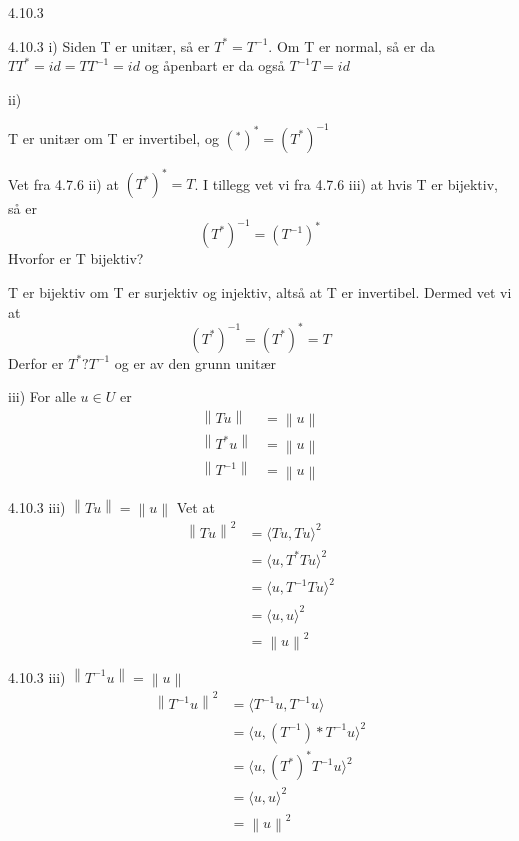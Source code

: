 \documentclass[a4paper,norsk]{article}
\begin{document}
\begin{oppgavebox}{4.10.3}{}
\begin{proofbox}{4.10.3 i)}{}
    Siden T er unitær, så er $ T^* = T^{-1} $. Om T er normal, så er da $ TT^* = id  = TT^{-1} = id$ og åpenbart er da også $ T^{-1} T = id $ 
\end{proofbox}

ii)
\begin{proofbox}
    T er unitær om T er invertibel, og $ \left( ^* \right) ^* = \left( T^* \right) ^{-1} $ 

    Vet fra 4.7.6 ii) at $ \left( T^* \right) ^* = T $. I tillegg vet vi fra 4.7.6 iii) at hvis T er bijektiv, så er \[
        \left( T^* \right) ^{-1} = \left( T^{-1} \right) ^*
    \]
    Hvorfor er T bijektiv? 

    T er bijektiv om T er surjektiv og injektiv, altså at T er invertibel.
    Dermed vet vi at 
    \[
        \left( T^* \right) ^{-1} = \left( T^* \right) ^* = T
    \]
    Derfor er $ T^* ? T^{-1} $ og er av den grunn unitær 
\end{proofbox}

iii) For alle $ u \in U $ er 
\begin{align*}
    \left\lVert Tu \right\rVert &= \left\lVert u \right\rVert \\
    \left\lVert T^* u \right\rVert &= \left\lVert u \right\rVert \\
    \left\lVert T^{-1} \right\rVert &= \left\lVert u \right\rVert 
\end{align*}

\begin{proofbox}{4.10.3 iii) $ \left\lVert Tu \right\rVert = \left\lVert u \right\rVert  $ }{}
    Vet at \begin{align*}
        \left\lVert Tu \right\rVert ^2 &= \langle Tu, Tu \rangle_{  } ^2\\
        &= \langle u, T^*Tu \rangle_{  } ^2 \\
        &= \langle u, T^{-1}Tu \rangle_{  } ^2 \\
        &= \langle u, u \rangle_{  }^2\\
        &= \left\lVert u \right\rVert  ^2
    \end{align*}
\end{proofbox}

\begin{proofbox}{4.10.3 iii) $ \left\lVert T^{-1} u \right\rVert = \left\lVert u \right\rVert  $ }{}
    \begin{align*}
        \left\lVert T^{-1}u \right\rVert ^2 &= \langle T^{-1}u, T^{-1}u \rangle_{  } \\
        &= \langle u, \left( T^{-1} \right) *T^{-1}u \rangle_{  } ^2 \\
        &= \langle u, \left( T^* \right) ^*T^{-1}u \rangle_{  } ^2\\
        &= \langle u, u \rangle_{  }^2\\
        &= \left\lVert u \right\rVert  ^2
    \end{align*}
\end{proofbox}


\end{oppgavebox}
\end{document}
